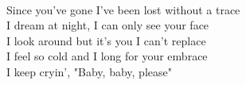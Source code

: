 \\
Since you've gone I've been lost without a trace \\
I dream at night, I can only see your face \\
I look around but it's you I can't replace \\
I feel so cold and I long for your embrace \\
I keep cryin', "Baby, baby, please" \\
